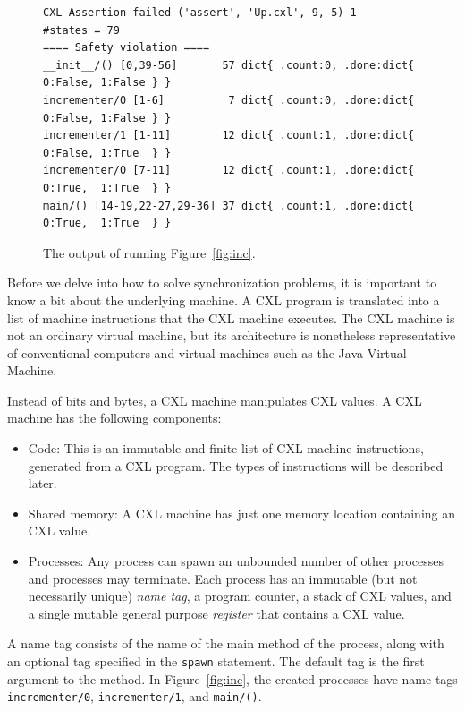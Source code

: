 \documentclass{report}
\newenvironment{code}{
\tcolorbox
}{
\endtcolorbox
}
\begin{document}
\begin{figure}
\begin{code}
\begin{verbatim}
CXL Assertion failed ('assert', 'Up.cxl', 9, 5) 1
#states = 79
==== Safety violation ====
__init__/() [0,39-56]       57 dict{ .count:0, .done:dict{ 0:False, 1:False } }
incrementer/0 [1-6]          7 dict{ .count:0, .done:dict{ 0:False, 1:False } }
incrementer/1 [1-11]        12 dict{ .count:1, .done:dict{ 0:False, 1:True  } }
incrementer/0 [7-11]        12 dict{ .count:1, .done:dict{ 0:True,  1:True  } }
main/() [14-19,22-27,29-36] 37 dict{ .count:1, .done:dict{ 0:True,  1:True  } }
\end{verbatim}
\end{code}
\caption{The output of running Figure~\ref{fig:inc}.}
\label{fig:incoutput}
\end{figure}

Before we delve into how to solve synchronization problems, it is important
to know a bit about the underlying machine.  A CXL program is translated
into a list of machine instructions that the CXL machine executes.
The CXL machine is not an ordinary virtual machine, but its architecture
is nonetheless representative of conventional computers and
virtual machines such as the Java Virtual Machine.

Instead of bits and bytes, a CXL machine manipulates CXL values.
A CXL machine has the following components:
\begin{itemize}
\item Code:  This is an immutable and finite list of CXL machine instructions,
generated from a CXL program.  The types of instructions will be described later.
\item Shared memory: A CXL machine has just one memory location containing
an CXL value.
\item Processes:  Any process
can spawn an unbounded number of other processes and processes may terminate.
Each process has an immutable (but not necessarily unique) \emph{name tag},
a program counter, a stack of CXL values,
and a single mutable general purpose \emph{register} that contains a CXL value.
\end{itemize}

A name tag consists of the name of the main method of the process,
along with an optional tag specified in the \texttt{spawn}
statement.
The default tag is the first argument to the method.
In Figure~\ref{fig:inc}, the created processes have name tags
\texttt{incrementer/0}, \texttt{incrementer/1}, and \texttt{main/()}.
\end{document}
